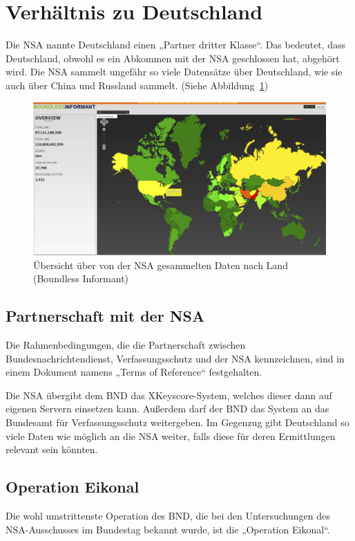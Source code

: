 \documentclass[12pt,a4paper]{scrartcl}
\begin{document}
\section{Verhältnis zu Deutschland}
Die NSA nannte Deutschland einen „Partner dritter Klasse“\cite{zeit_partner}. Das bedeutet, dass Deutschland, obwohl es ein Abkommen mit der NSA geschlossen hat, abgehört wird.\cite{zeit_partner} Die NSA sammelt ungefähr so viele Datensätze über Deutschland, wie sie auch über China und Russland sammelt. (Siehe Abbildung~\ref{fig:boundless_informant})

\begin{figure}[H]
\centering
\includegraphics[width=\textwidth]{images/bi.png}
\caption{Übersicht über von der NSA gesammelten Daten nach Land (Boundless Informant)\cite{nsa_bi}}
\label{fig:boundless_informant}
\end{figure}

\subsection{Partnerschaft mit der NSA}
Die Rahmenbedingungen, die die Partnerschaft zwischen Bundesnachrichtendienst, Verfassungsschutz und der NSA kennzeichnen, sind in einem Dokument namens „Terms of Reference“ festgehalten.\cite{zeit_tor}

Die NSA übergibt dem BND das XKeyscore-System, welches dieser dann auf eigenen Servern einsetzen kann. Außerdem darf der BND das System an das Bundesamt für Verfassungsschutz weitergeben. Im Gegenzug gibt Deutschland so viele Daten wie möglich an die NSA weiter, falls diese für deren Ermittlungen relevant sein könnten.\cite{zeit_tor}

\subsection{Operation Eikonal}
Die wohl umstrittenste Operation des BND, die bei den Untersuchungen des NSA-Ausschusses im Bundestag bekannt wurde, ist die „Operation Eikonal“. \cite{zeit_eikonal}
\end{document}
